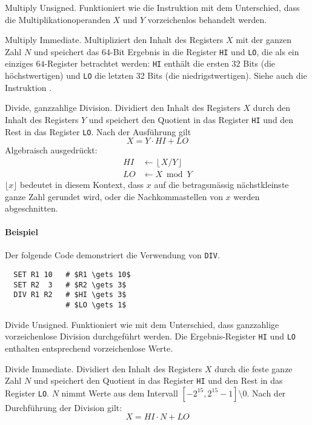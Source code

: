 \glqq Multiply Unsigned\grqq.
Funktioniert wie die Instruktion  mit dem Unterschied, dass die
Multiplikationoperanden $X$ und $Y$ vorzeichenlos behandelt werden. 



\glqq Multiply Immediate\grqq.
Multipliziert den Inhalt des Registers $X$ mit der ganzen Zahl $N$ und speichert
das $64$-Bit Ergebnis in die Register \texttt{HI} und \texttt{LO}, die als ein
einziges $64$-Register betrachtet werden: \texttt{HI} enthält die ersten $32$
Bits (die höchstwertigen) und \texttt{LO} die letzten 32 Bits (die
niedrigstwertigen).
Siehe auch die Instruktion .



\glqq Divide\grqq, ganzzahlige Division.
Dividiert den Inhalt des Registers $X$ durch den Inhalt des Registers $Y$ und
speichert den Quotient in das Register \texttt{HI} und den Rest in das Register
\texttt{LO}.
Nach der Ausführung gilt
\[
    X = Y \cdot HI + LO
\]
Algebraisch ausgedrückt:
\begin{align*}
  HI & \gets \left\lfloor X/Y \right\rfloor \\
  LO & \gets X \bmod Y
\end{align*}
$\lfloor x \rfloor$ bedeutet in diesem Kontext, dass $x$ auf die betragsmässig
nächstkleinste ganze Zahl gerundet wird, oder die Nachkommastellen von $x$
werden abgeschnitten.


\paragraph{Beispiel}
Der folgende Code demonstriert die Verwendung von \texttt{DIV}.
\begin{lstlisting}
  SET R1 10   # $R1 \gets 10$
  SET R2  3   # $R2 \gets 3$
  DIV R1 R2   # $HI \gets 3$
              # $LO \gets 1$
\end{lstlisting}


\glqq Divide Unsigned\grqq.
Funktioniert wie  mit dem Unterschied, dass ganzzahlige
vorzeichenlose Division durchgeführt werden. Die Ergebnis-Register \texttt{HI}
und \texttt{LO} enthalten entsprechend vorzeichenlose Werte.



\glqq Divide Immediate\grqq.
Dividiert den Inhalt des Registers $X$ durch die feste ganze Zahl $N$ und
speichert den Quotient in das Register \texttt{HI} und den Rest in das Register
\texttt{LO}.
$N$ nimmt Werte aus dem Intervall $[-2^{15}, 2^{15}-1] \setminus 0$.
Nach der Durchführung der Division gilt:
\[
    X = HI \cdot N + LO 
\]
